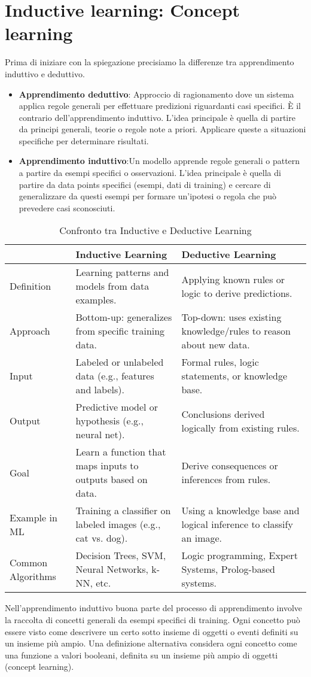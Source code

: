 \documentclass{../main.tex}[subfiles]
\begin{document}
\chapter{Inductive learning: Concept learning}
Prima di iniziare con la spiegazione precisiamo la differenze tra apprendimento induttivo e deduttivo.
\begin{itemize}
	\item \textbf{Apprendimento deduttivo}: Approccio di ragionamento dove un sistema applica regole generali per effettuare predizioni riguardanti casi specifici. È il contrario dell'apprendimento induttivo. 
	L'idea principale è quella di partire da principi generali, teorie o regole note a priori. Applicare queste a situazioni specifiche per determinare risultati.
	\item \textbf{Apprendimento induttivo}:Un modello apprende regole generali o pattern a partire da esempi specifici o osservazioni.
	L'idea principale è quella di partire da data points specifici (esempi, dati di training) e cercare di generalizzare da questi esempi per formare un'ipotesi o regola che può prevedere casi sconosciuti.
\end{itemize}
\begin{table}[h!]
\centering
\renewcommand{\arraystretch}{1.5}
\begin{tabular}{|m{3cm}|m{6cm}|m{6cm}|}
\hline \textbf{} & \textbf{Inductive Learning} & \textbf{Deductive Learning} \\
\hline
Definition & Learning patterns and models from data examples. & Applying known rules or logic to derive predictions. \\
\hline
Approach & Bottom-up: generalizes from specific training data. & Top-down: uses existing knowledge/rules to reason about new data. \\
\hline
Input & Labeled or unlabeled data (e.g., features and labels). & Formal rules, logic statements, or knowledge base. \\
\hline
Output & Predictive model or hypothesis (e.g., neural net). & Conclusions derived logically from existing rules. \\
\hline
Goal & Learn a function that maps inputs to outputs based on data. & Derive consequences or inferences from rules. \\
\hline
Example in ML & Training a classifier on labeled images (e.g., cat vs. dog). & Using a knowledge base and logical inference to classify an image. \\
\hline
Common Algorithms & Decision Trees, SVM, Neural Networks, k-NN, etc. & Logic programming, Expert Systems, Prolog-based systems. \\
\hline
\end{tabular}
\caption{Confronto tra Inductive e Deductive Learning}
\end{table}
Nell'apprendimento induttivo buona parte del processo di apprendimento involve la raccolta di concetti generali da esempi specifici di training.
Ogni concetto può essere visto come descrivere un certo sotto insieme di oggetti o eventi definiti su un insieme più ampio. Una definizione alternativa considera ogni concetto come una funzione a valori booleani,
definita su un insieme più ampio di oggetti (concept learning).
\end{document}
